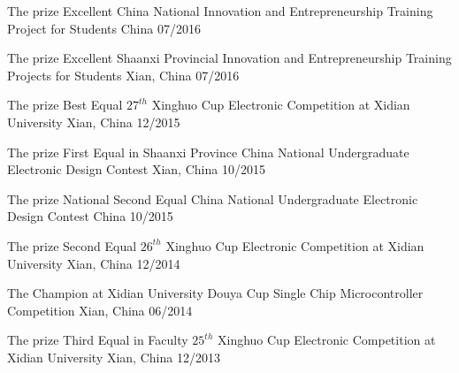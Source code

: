 \begin{cvhonors}

  \cvhonor
    {The prize Excellent} %
    {China National Innovation and Entrepreneurship Training Project for Students} %
    {China} %
    {07/2016} %

  \cvhonor
    {The prize Excellent} %
    {Shaanxi Provincial Innovation and Entrepreneurship Training Projects for Students} %
    {Xian, China} %
    {07/2016} %

  \cvhonor
    {The prize Best Equal} %
    {$27^{th}$ Xinghuo Cup Electronic Competition at Xidian University} %
    {Xian, China} %
    {12/2015} %

  \cvhonor
	{The prize First Equal in Shaanxi Province} %
	{China National Undergraduate Electronic Design Contest} %
	{Xian, China} %
	{10/2015} %

  \cvhonor
	{The prize National Second Equal} %
	{China National Undergraduate Electronic Design Contest} %
	{China} %
	{10/2015} %

  \cvhonor
	{The prize Second Equal } %
	{$26^{th}$ Xinghuo Cup Electronic Competition at Xidian University} %
	{Xian, China} %
	{12/2014} %

  \cvhonor
	{The Champion at Xidian University} %
	{Douya Cup Single Chip Microcontroller Competition} %
	{Xian, China} %
	{06/2014} %

  \cvhonor
	{The prize Third Equal in Faculty} %
	{$25^{th}$ Xinghuo Cup Electronic Competition at Xidian University}%
	{Xian, China} %
	{12/2013} %

 

\end{cvhonors}

